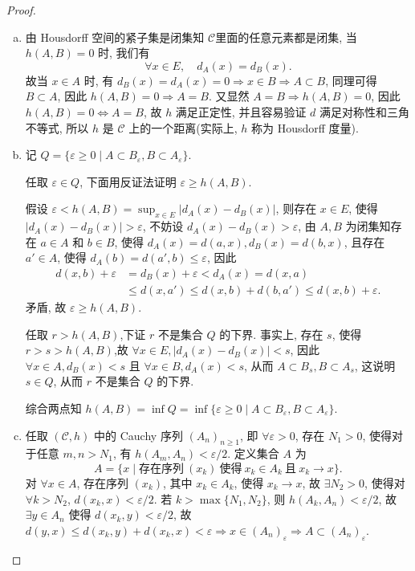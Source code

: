 \begin{proof}
\begin{enumerate}[(a)]
  \item 由 Housdorff 空间的紧子集是闭集知 $\mathcal{C}$里面的任意元素都是闭集,
    当 $h(A,B)=0$ 时, 我们有
    \[\forall x\in E,\quad d_A(x)=d_B(x).\]
    故当 $x\in A$ 时, 有 $d_B(x)=d_A(x)=0\Rightarrow x\in B\Rightarrow A\subset B$, 
    同理可得 $B\subset A$, 因此 $h(A,B)=0\Rightarrow A=B$.
    又显然 $A=B\Rightarrow h(A,B)=0$, 因此$h(A,B)=0\Leftrightarrow A=B$,
    故 $h$ 满足正定性, 并且容易验证 $d$ 满足对称性和三角不等式,
    所以 $h$ 是 $\mathcal{C}$ 上的一个距离(实际上, $h$ 称为 Housdorff 度量).

  \item 记 $Q=\{\varepsilon\geq 0\mid A\subset B_\varepsilon, B\subset A_\varepsilon\}$.

    任取 $\varepsilon\in Q$, 下面用反证法证明 $\varepsilon\geq h(A,B)$.

    假设 $\varepsilon <h(A,B)=\sup_{x\in E}|d_A(x)-d_B(x)|$,
    则存在 $x\in E$, 使得 $|d_A(x)-d_B(x)|>\varepsilon$,
    不妨设 $d_A(x)-d_B(x)>\varepsilon$,
    由 $A,B$ 为闭集知存在 $a\in A$ 和 $b\in B$, 使得 $d_A(x)=d(a,x),d_B(x)=d(b,x)$,
    且存在 $a'\in A$, 使得 $d_A(b)=d(a',b)\leq\varepsilon$,
    因此
    \begin{align*}
        d(x,b)+\varepsilon 
        &=d_B(x)+\varepsilon <d_A(x)=d(x,a) \\
        &\leq d(x,a')\leq d(x,b)+d(b,a')\leq d(x,b)+\varepsilon.
    \end{align*}
    矛盾, 故 $\varepsilon\geq h(A,B)$.

    任取 $r>h(A,B)$,下证 $r$ 不是集合 $Q$ 的下界.
    事实上, 存在 $s$, 使得 $r>s>h(A,B)$,故 $\forall x\in E,|d_A(x)-d_B(x)|<s$,
    因此 $\forall x\in A,d_B(x)<s$ 且 $\forall x\in B,d_A(x)<s$,
    从而 $A\subset B_s,B\subset A_s$, 这说明 $s\in Q$, 从而 $r$ 不是集合 $Q$ 的下界.

    综合两点知 $h(A,B)=\inf Q=\inf\{\varepsilon\geq 0\mid A\subset B_{\varepsilon}, B\subset A_{\varepsilon}\}$.

  \item 任取 $(\mathcal{C},h)$ 中的 Cauchy 序列 $(A_n)_{n\geq 1}$,
    即 $\forall\varepsilon >0$, 存在 $N_1 > 0$, 
    使得对于任意 $m,n>N_1$, 有 $h(A_m,A_n)<\varepsilon /2$.
    定义集合 $A$ 为
    \[A = \{x\mid\text{存在序列}\ (x_k)\ \text{使得}\ x_k\in A_k
        \ \text{且}\ x_k\rightarrow x\}.\]
    对 $\forall x\in A$, 存在序列 $(x_k)$, 其中 $x_k\in A_k$, 
    使得 $x_k\rightarrow x$, 故 $\exists N_2>0$, 使得对 $\forall k>N_2$,
    $d(x_k,x)<\varepsilon /2$.
    若 $k > \max\{N_1,N_2\}$, 则 $h(A_k,A_n)<\varepsilon /2$, 
    故 $\exists y\in A_n$ 使得 $d(x_k,y)<\varepsilon /2$,
    故 $d(y,x)\leq d(x_k,y)+d(x_k,x)<\varepsilon\Rightarrow x\in (A_n)_\varepsilon\Rightarrow A\subset (A_n)_\varepsilon$.


\end{enumerate}
\end{proof}
